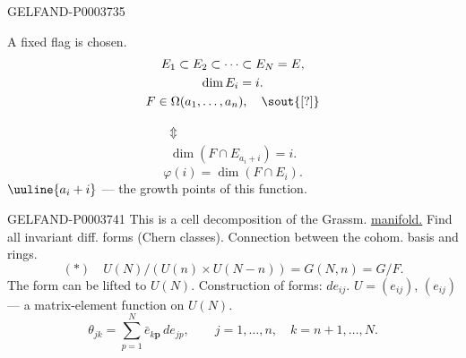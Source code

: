 \begin{GelfandAdjacentEvidence}{GELFAND-P000373}{5}

A fixed flag is chosen.
\begin{gather*}E_1\subset E_2\subset\dots\subset E_N=E,\\\dim E_i=i.\\
F\in\Omega (a_1,\dots, a_n),\quad\text{\sout{[?]}}\end{gather*}
\end{GelfandAdjacentEvidence}

\begin{gather*}\Updownarrow\\\dim (F\cap E_{a_i+i})=i.\end{gather*}
\begin{equation*}\varphi (i)=\dim (F\cap E_i).\end{equation*}
$\uuline{a_i+i}$ --- the growth points of this function.


\begin{GelfandAdjacentEvidence}{GELFAND-P000374}{1}
This is a cell decomposition of the Grassm. \underline{manifold.}
 Find all invariant diff. forms (Chern classes).
Connection between the cohom. basis and rings.
\begin{equation*}(*)\quad U (N)/(U (n)\times U (N-n))=G (N, n)=G/F.\end{equation*}
The form can be lifted to $U (N)$.
Construction of forms:
$de_{ij}$.
$U=(e_{ij})$, $(e_{ij})$ --- a matrix-element function on $U (N)$.
\begin{equation*}\theta_{jk}=\sum_{p=1}^N\bar e_{k\boldsymbol p}\, de_{jp},\qquad j=1,\dots, n,\quad k=n+1,\dots, N.\end{equation*}
\end{GelfandAdjacentEvidence}




